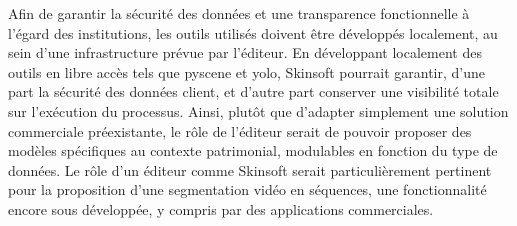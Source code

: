 Afin de garantir la sécurité des données et une transparence fonctionnelle à l'égard des institutions, les outils utilisés doivent être développés localement, au sein d'une infrastructure prévue par l'éditeur. En développant localement des outils en libre accès tels que \gls{pyscene} et \gls{yolo}, Skinsoft pourrait garantir, d'une part la sécurité des données client, et d'autre part conserver une visibilité totale sur l'exécution du processus. Ainsi, plutôt que d'adapter simplement une solution commerciale préexistante, le rôle de l'éditeur serait de pouvoir proposer des modèles spécifiques au contexte patrimonial, modulables en fonction du type de données. Le rôle d'un éditeur comme Skinsoft serait particulièrement pertinent pour la proposition d'une segmentation vidéo en séquences, une fonctionnalité encore sous développée, y compris par des applications commerciales. 
